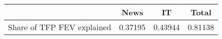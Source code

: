 \begin{small}
	\begin{tabular}{lccc}
	\hline
		& News & IT & Total \\
		\hline
		Share of TFP FEV explained & 0.37195 & 0.43944 & 0.81138 \\
		\hline
	\end{tabular}
\end{small}
